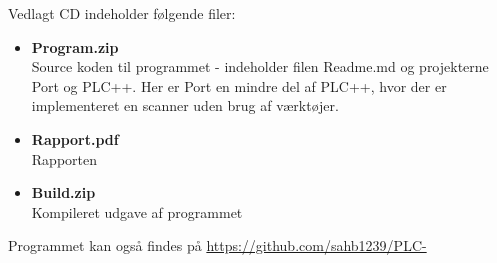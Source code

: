 Vedlagt CD indeholder følgende filer:

\begin{itemize}
    \item \textbf{Program.zip}\\Source koden til programmet - indeholder filen Readme.md og projekterne Port og PLC++. Her er Port en mindre del af PLC++, hvor der er implementeret en scanner uden brug af værktøjer.
    \item \textbf{Rapport.pdf} \\Rapporten
    \item \textbf{Build.zip}  \\Kompileret udgave af programmet
\end{itemize}

\noindent Programmet kan også findes på \url{https://github.com/sahb1239/PLC-}